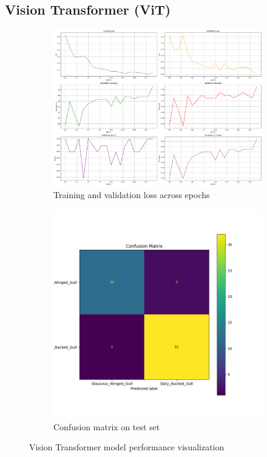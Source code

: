 \documentclass[a4paper,12pt]{report}
\begin{document}
\subsection{Vision Transformer (ViT)}
\begin{figure}[H]
    \centering
    \begin{subfigure}[b]{0.48\textwidth}
        \centering
        \includegraphics[width=\textwidth]{images/appendix/modelgraph/vit/vit.png}
        \caption{Training and validation loss across epochs}
        \label{fig:vit_training}
    \end{subfigure}
    \hfill
    \begin{subfigure}[b]{0.48\textwidth}
        \centering
        \includegraphics[width=\textwidth]{images/appendix/modelgraph/vit/confusion_matrix.png}
        \caption{Confusion matrix on test set}
        \label{fig:vit_confusion}
    \end{subfigure}
    \caption{Vision Transformer model performance visualization}
    \label{fig:vit_performance}
\end{figure}
\end{document}
